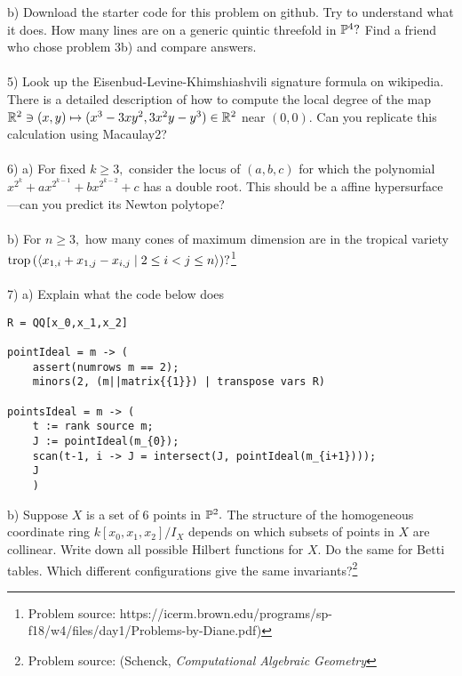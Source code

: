 \documentclass{article}
\begin{document}
b) Download the starter code for this problem on github. Try to understand what it does. How many lines are on a generic quintic threefold in $\mathbb{P}^4?$ Find a friend who chose problem 3b) and compare answers.\\\\
5) Look up the Eisenbud-Levine-Khimshiashvili signature formula on wikipedia. There is a detailed description of how to compute the local degree of the map $\mathbb{R}^2 \ni (x,y) \mapsto (x^3 - 3 x y^2, 3 x^2 y - y^3) \in \mathbb{R}^2$ near $(0,0).$ Can you replicate this calculation using Macaulay2?\\\\
6) a) For fixed $k\ge 3,$ consider the locus of $(a,b,c)$ for which the polynomial $x^{2^k} + a x^{2^{k-1}} + b x^{2^{k-2}} + c$ has a double root. This should be a affine hypersurface---can you predict its Newton polytope?\\\\
b) For $n\ge 3,$ how many cones of maximum dimension are in the tropical variety $\operatorname{\rm trop} \left( \langle x_{1, i} + x_{1,j } - x_{i, j} \mid 2 \le i < j \le n \rangle \right)? $\footnote{Problem source:  https://icerm.brown.edu/programs/sp-f18/w4/files/day1/Problems-by-Diane.pdf)}\\\\
7) a) Explain what the code below does 
\begin{verbatim}
R = QQ[x_0,x_1,x_2]

pointIdeal = m -> (
    assert(numrows m == 2);
    minors(2, (m||matrix{{1}}) | transpose vars R)

pointsIdeal = m -> (
    t := rank source m;
    J := pointIdeal(m_{0});
    scan(t-1, i -> J = intersect(J, pointIdeal(m_{i+1})));
    J
    )
\end{verbatim}
b) Suppose $X$ is a set of $6$ points in $\mathbb{P}^2.$ The structure of the homogeneous coordinate ring $k[x_0,x_1,x_2]/I_X$ depends on which subsets of points in $X$ are collinear. Write down all possible Hilbert functions for $X.$ Do the same for Betti tables. Which different configurations give the same invariants?\footnote{Problem source: (Schenck, \emph{Computational Algebraic Geometry}}
\end{document}
